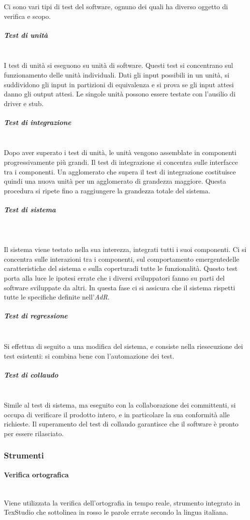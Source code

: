 		Ci sono vari tipi di test del software, ognuno dei quali ha diverso oggetto di verifica e scopo.
			\subparagraph{Test di unità} \mbox{}\\
			I test di unità si eseguono su unità di software. Questi test si concentrano sul funzionamento delle unità individuali. Dati gli input possibili in un unità, si suddividono gli input in partizioni di equivalenza e si prova se gli input attesi danno gli output attesi. Le singole unità possono essere testate con l'ausilio di driver e stub.
			\subparagraph{Test di integrazione} \mbox{}\\
			Dopo aver superato i test di unità, le unità vengono assemblate in componenti progressivamente più grandi. Il test di integrazione si concentra sulle interfacce tra i componenti. Un agglomerato che supera il test di integrazione costituisce quindi una nuova unità per un agglomerato di grandezza maggiore. Questa procedura si ripete fino a raggiungere la grandezza totale del sistema.
			\subparagraph{Test di sistema} \mbox{}\\\\
			Il sistema viene testato nella sua interezza, integrati tutti i suoi componenti. Ci si concentra sulle interazioni tra i componenti, sul comportamento emergente\glosp delle caratteristiche del sistema e sulla copertura\glosp di tutte le funzionalità. Questo test porta alla luce le ipotesi errate che i diversi sviluppatori fanno su parti del software sviluppate da altri.
			In questa fase ci si assicura che il sistema rispetti tutte le specifiche definite nell'\textit{AdR}.
			\subparagraph{Test di regressione} \mbox{}\\
			Si effettua di seguito a una modifica del sistema, e consiste nella riesecuzione dei test esistenti: si combina bene con l'automazione dei test.
			\subparagraph{Test di collaudo} \mbox{}\\
			Simile al test di sistema, ma eseguito con la collaborazione dei committenti, si occupa di verificare il prodotto intero, e in particolare la sua conformità alle richieste. Il superamento del test di collaudo garantisce che il software è pronto per essere rilasciato.
	\subsubsection{Strumenti}
		\paragraph{Verifica ortografica} \mbox{}\\
		Viene utilizzata la verifica dell'ortografia in tempo reale, strumento integrato in TexStudio che sottolinea in rosso le parole errate secondo la lingua italiana.
